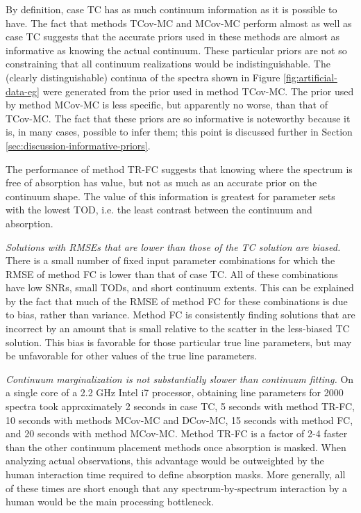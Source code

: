 \documentclass[manuscript]{aastex62}
\begin{document}
{By definition, case TC has as much continuum information as it is possible to have.
The fact that methods TCov-MC and MCov-MC perform almost as well as case TC suggests that the accurate priors used in these methods are almost as informative as knowing the actual continuum.
These particular priors are not so constraining that all continuum realizations would be indistinguishable.
The (clearly distinguishable) continua of the spectra shown in Figure \ref{fig:artificial-data-eg} were generated from the prior used in method TCov-MC.
The prior used by method MCov-MC is less specific, but apparently no worse, than that of TCov-MC.
The fact that these priors are so informative is noteworthy because it is, in many cases, possible to infer them; this point is discussed further in Section \ref{sec:discussion-informative-priors}.

The performance of method TR-FC suggests that knowing where the spectrum is free of absorption has value, but not as much as an accurate prior on the continuum shape.
The value of this information is greatest for parameter sets with the lowest TOD, i.e. the least contrast between the continuum and absorption.

\emph{Solutions with RMSEs that are lower than those of the TC solution are biased.}
There is a small number of fixed input parameter combinations for which the RMSE of method FC is lower than that of case TC.
All of these combinations have low SNRs, small TODs, and short continuum extents.
This can be explained by the fact that much of the RMSE of method FC for these combinations is due to bias, rather than variance.
Method FC is consistently finding solutions that are incorrect by an amount that is small relative to the scatter in the less-biased TC solution.
This bias is favorable for those particular true line parameters, but may be unfavorable for other values of the true line parameters.

\emph{Continuum marginalization is not substantially slower than continuum fitting.}
On a single core of a 2.2 GHz Intel i7 processor, obtaining line parameters for 2000 spectra took approximately 2 seconds in case TC, 5 seconds with method TR-FC, 10 seconds with methods MCov-MC and DCov-MC, 15 seconds with method FC, and 20 seconds with method MCov-MC.
Method TR-FC is a factor of 2-4 faster than the other continuum placement methods once absorption is masked.
When analyzing actual observations, this advantage would be outweighted by the human interaction time required to define absorption masks.
More generally, all of these times are short enough that any spectrum-by-spectrum interaction by a human would be the main processing bottleneck.
}
\end{document}
